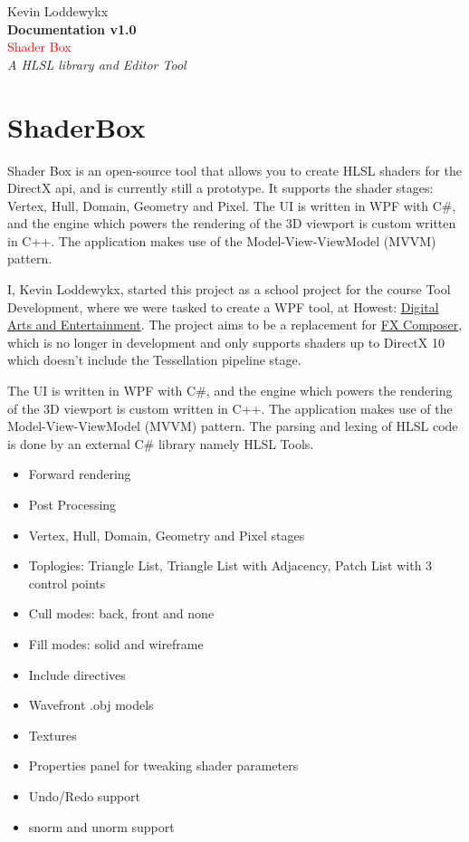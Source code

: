 \documentclass{paper}
\newcommand{\frontpage}
{
	\begin{titlepage}
	
	\raggedleft
	\changebar
	\vspace{\baselineskip}

	{\small Kevin Loddewykx}\\[0.167\textheight]
	{\large \bfseries Documentation v1.0}\\[\baselineskip]
	{\textcolor{Red}{\huge Shader Box}}\\[\baselineskip]
	{\large \textit{A HLSL library and Editor Tool}}\\[\baselineskip]
	\vfill
	\endchangebar
	\end{titlepage}
}
\begin{document}
\frontpage

\newpage
\tableofcontents

\raggedright

\newpage
\section{ShaderBox}
Shader Box is an open-source tool that allows you to create HLSL shaders for the DirectX api, and is currently still a prototype. It supports the shader stages: Vertex, Hull, Domain, Geometry and Pixel. The UI is written in WPF with C\#, and the engine which powers the rendering of the 3D viewport is custom written in C++. The application makes use of the Model-View-ViewModel (MVVM) pattern.
\par
I, Kevin Loddewykx, started this project as a school project for the course Tool Development, where we were tasked to create a WPF tool, at Howest: \href{http://www.digitalartsandentertainment.com/}{Digital Arts and Entertainment}. The project aims to be a replacement for \href{https://developer.nvidia.com/fx-composer}{FX Composer}, which is no longer in development and only supports shaders up to DirectX 10 which doesn't include the Tessellation pipeline stage.
\par
The UI is written in WPF with C\#, and the engine which powers the rendering of the 3D viewport is custom written in C++. The application makes use of the Model-View-ViewModel (MVVM) pattern. The parsing and lexing of HLSL code is done by an external C\# library namely HLSL Tools.
\par
\begin{itemize}[noitemsep]
\item Forward rendering
\item Post Processing
\item Vertex, Hull, Domain, Geometry and Pixel stages
\item Toplogies: Triangle List, Triangle List with Adjacency, Patch List with 3 control points
\item Cull modes: back, front and none
\item Fill modes: solid and wireframe
\item Include directives
\item Wavefront .obj models
\item Textures
\item Properties panel for tweaking shader parameters
\item Undo/Redo support
\item snorm and unorm support
\end{itemize}
\end{document}
